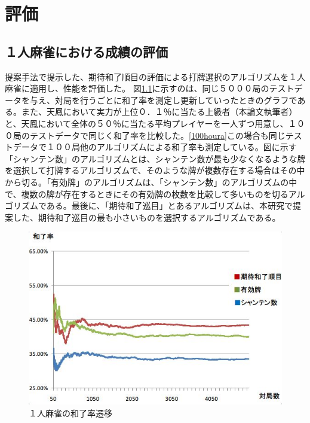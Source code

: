 \chapter{評価}
\label{chap:evaluation}
\section{１人麻雀における成績の評価}
提案手法で提示した、期待和了順目の評価による打牌選択のアルゴリズムを１人麻雀に適用し、性能を評価した。
図\ref{1houra}に示すのは、同じ５０００局のテストデータを与え、対局を行うごとに和了率を測定し更新していったときのグラフである。また、天鳳において実力が上位０．１％に当たる上級者（本論文執筆者）と、天鳳において全体の５０％に当たる平均プレイヤーを一人ずつ用意し、１００局のテストデータで同じく和了率を比較した。\ref{100houra}この場合も同じテストデータで１００局他のアルゴリズムによる和了率も測定している。図に示す「シャンテン数」のアルゴリズムとは、シャンテン数が最も少なくなるような牌を選択して打牌するアルゴリズムで、そのような牌が複数存在する場合はその中から切る。「有効牌」のアルゴリズムは、「シャンテン数」のアルゴリズムの中で、複数の牌が存在するときにその有効牌の枚数を比較して多いものを切るアルゴリズムである。最後に、「期待和了巡目」とあるアルゴリズムは、本研究で提案した、期待和了巡目の最も小さいものを選択するアルゴリズムである。


\begin{figure}[h]
 \centering
 \includegraphics[keepaspectratio, scale=0.8,bb=0 0 549 374]
      {img/1houra.jpg}
 \caption{１人麻雀の和了率遷移}
 \label{1houra}
\end{figure}

